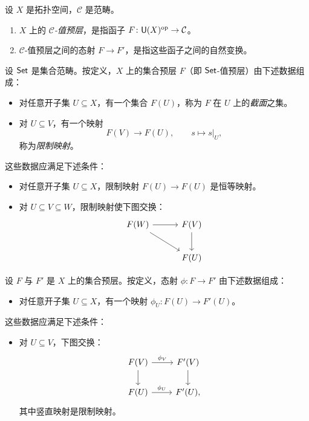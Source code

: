 \begin{definition}\label{def:1.1.2}
设 $X$ 是拓扑空间，$\mathcal C$ 是范畴。
\begin{enumerate}[label=(\roman*),leftmargin=2em,itemsep=0.25ex]
  \item $X$ 上的 \emph{$\mathcal C$-值预层}，是指函子 $F\colon \mathsf{U}(X)^{\mathrm{op}}\to\mathcal C$。
  \item $\mathcal C$-值预层之间的态射 $F\to F'$，是指这些函子之间的自然变换。
\end{enumerate}
\end{definition}

设 $\mathsf{Set}$ 是集合范畴。按定义，$X$ 上的集合预层 $F$（即 $\mathsf{Set}$-值预层）由下述数据组成：
\begin{itemize}
  \item 对任意开子集 $U\subseteq X$，有一个集合 $F(U)$，称为 $F$ 在 $U$ 上的\emph{截面}之集。
  \item 对 $U\subseteq V$，有一个映射
  \[
  F(V)\to F(U),\qquad s\mapsto s|_U,
  \]
  称为\emph{限制映射}。
\end{itemize}
这些数据应满足下述条件：
\begin{itemize}
  \item 对任意开子集 $U\subseteq X$，限制映射 $F(U)\to F(U)$ 是恒等映射。
  \item 对 $U\subseteq V\subseteq W$，限制映射使下图交换：
  \[
  \begin{tikzcd}[row sep=2.2em,column sep=3em]
  F(W) \arrow[r] \arrow[dr] & F(V) \arrow[d] \\
  & F(U)
  \end{tikzcd}
  \]
\end{itemize}

设 $F$ 与 $F'$ 是 $X$ 上的集合预层。按定义，态射 $\phi\colon F\to F'$ 由下述数据组成：
\begin{itemize}
  \item 对任意开子集 $U\subseteq X$，有一个映射 $\phi_U\colon F(U)\to F'(U)$。
\end{itemize}
这些数据应满足下述条件：
\begin{itemize}
  \item 对 $U\subseteq V$，下图交换：
  \[
  \begin{tikzcd}
  F(V) \arrow[r,"\phi_V"] \arrow[d] & F'(V) \arrow[d] \\
  F(U) \arrow[r,"\phi_U"] & F'(U),
  \end{tikzcd}
  \]
  其中竖直映射是限制映射。
\end{itemize}

